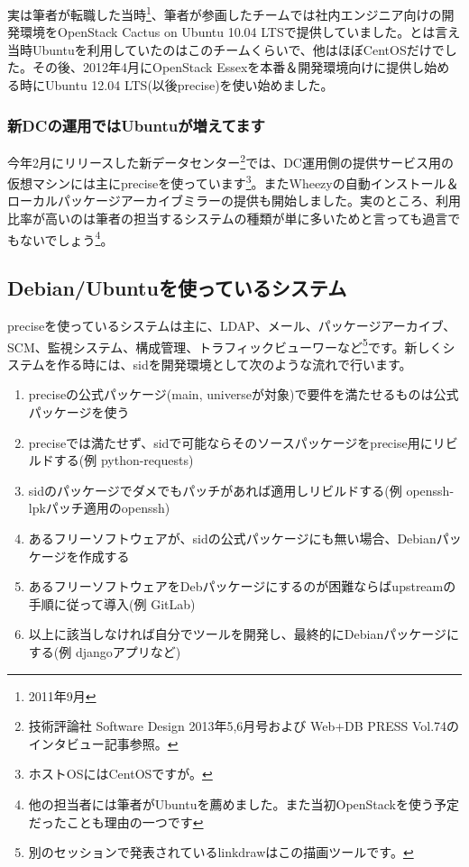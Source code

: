\documentclass[mingoth,a4paper,twoside]{jsarticle}
\begin{document}
実は筆者が転職した当時\footnote{2011年9月}、筆者が参画したチームでは社内エンジニア向けの開発環境をOpenStack Cactus on Ubuntu 10.04 LTSで提供していました。とは言え当時Ubuntuを利用していたのはこのチームくらいで、他はほぼCentOSだけでした。その後、2012年4月にOpenStack Essexを本番＆開発環境向けに提供し始める時にUbuntu 12.04 LTS(以後precise)を使い始めました。

\subsubsection{新DCの運用ではUbuntuが増えてます}

今年2月にリリースした新データセンター\footnote{技術評論社 Software Design 2013年5,6月号および Web+DB PRESS Vol.74のインタビュー記事参照。}では、DC運用側の提供サービス用の仮想マシンには主にpreciseを使っています\footnote{ホストOSにはCentOSですが。}。またWheezyの自動インストール＆ローカルパッケージアーカイブミラーの提供も開始しました。実のところ、利用比率が高いのは筆者の担当するシステムの種類が単に多いためと言っても過言でもないでしょう\footnote{他の担当者には筆者がUbuntuを薦めました。また当初OpenStackを使う予定だったことも理由の一つです}。

\subsection{Debian/Ubuntuを使っているシステム}

preciseを使っているシステムは主に、LDAP、メール、パッケージアーカイブ、SCM、監視システム、構成管理、トラフィックビューワーなど\footnote{別のセッションで発表されているlinkdrawはこの描画ツールです。}です。新しくシステムを作る時には、sidを開発環境として次のような流れで行います。

\begin{enumerate}
  \item preciseの公式パッケージ(main, universeが対象)で要件を満たせるものは公式パッケージを使う
  \item preciseでは満たせず、sidで可能ならそのソースパッケージをprecise用にリビルドする(例 python-requests)
  \item sidのパッケージでダメでもパッチがあれば適用しリビルドする(例 openssh-lpkパッチ適用のopenssh)
  \item あるフリーソフトウェアが、sidの公式パッケージにも無い場合、Debianパッケージを作成する
  \item あるフリーソフトウェアをDebパッケージにするのが困難ならばupstreamの手順に従って導入(例 GitLab)
  \item 以上に該当しなければ自分でツールを開発し、最終的にDebianパッケージにする(例 djangoアプリなど)
\end{enumerate}
\end{document}
